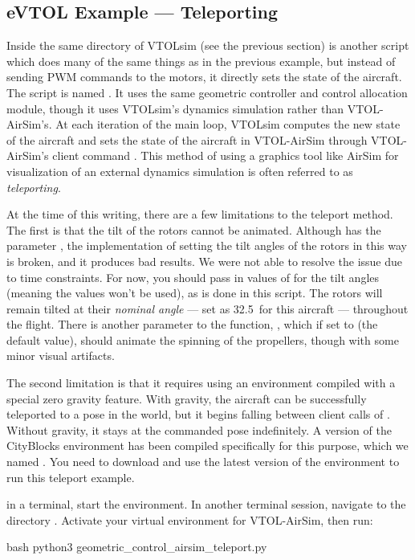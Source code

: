 \subsection{eVTOL Example --- Teleporting}\label{sec:vtol_teleport}
Inside the same  directory of VTOLsim (see the previous section) is another script which does many of the same things as in the previous example, but instead of sending PWM commands to the motors, it directly sets the state of the aircraft. The script is named . It uses the same geometric controller and control allocation module, though it uses VTOLsim's dynamics simulation rather than VTOL-AirSim's. At each iteration of the main loop, VTOLsim computes the new state of the aircraft and sets the state of the aircraft in VTOL-AirSim through VTOL-AirSim's client command . This method of using a graphics tool like AirSim for visualization of an external dynamics simulation is often referred to as \textit{teleporting}.

At the time of this writing, there are a few limitations to the teleport method. The first is that the tilt of the rotors cannot be animated. Although  has the parameter , the implementation of setting the tilt angles of the rotors in this way is broken, and it produces bad results. We were not able to resolve the issue due to time constraints. For now, you should pass in values of  for the tilt angles (meaning the values won't be used), as is done in this script. The rotors will remain tilted at their \textit{nominal angle} --- set as 32.5\degree~for this aircraft --- throughout the flight. There is another parameter to the function, , which if set to  (the default value), should animate the spinning of the propellers, though with some minor visual artifacts.

The second limitation is that it requires using an environment compiled with a special zero gravity feature. With gravity, the aircraft can be successfully teleported to a pose in the world, but it begins falling between client calls of . Without gravity, it stays at the commanded pose indefinitely. A version of the CityBlocks environment has been compiled specifically for this purpose, which we named . You need to download and use the latest version of the  environment to run this teleport example.

in a terminal, start the  environment. In another terminal session, navigate to the directory . Activate your virtual environment for VTOL-AirSim, then run:
\begin{minttcb}[title={Python Script for Teleporting}]{bash}
python3 geometric_control_airsim_teleport.py
\end{minttcb}

